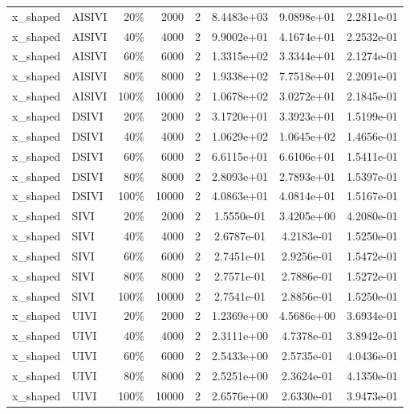 \begin{tabular}{llrrrccc}
x\_shaped & AISIVI & 20\% & 2000 & 2 & 8.4483e+03 & 9.0898e+01 & 2.2811e-01 \\
x\_shaped & AISIVI & 40\% & 4000 & 2 & 9.9002e+01 & 4.1674e+01 & 2.2532e-01 \\
x\_shaped & AISIVI & 60\% & 6000 & 2 & 1.3315e+02 & 3.3344e+01 & 2.1274e-01 \\
x\_shaped & AISIVI & 80\% & 8000 & 2 & 1.9338e+02 & 7.7518e+01 & 2.2091e-01 \\
x\_shaped & AISIVI & 100\% & 10000 & 2 & 1.0678e+02 & 3.0272e+01 & 2.1845e-01 \\
x\_shaped & DSIVI & 20\% & 2000 & 2 & 3.1720e+01 & 3.3923e+01 & 1.5199e-01 \\
x\_shaped & DSIVI & 40\% & 4000 & 2 & 1.0629e+02 & 1.0645e+02 & 1.4656e-01 \\
x\_shaped & DSIVI & 60\% & 6000 & 2 & 6.6115e+01 & 6.6106e+01 & 1.5411e-01 \\
x\_shaped & DSIVI & 80\% & 8000 & 2 & 2.8093e+01 & 2.7893e+01 & 1.5397e-01 \\
x\_shaped & DSIVI & 100\% & 10000 & 2 & 4.0863e+01 & 4.0814e+01 & 1.5167e-01 \\
x\_shaped & SIVI & 20\% & 2000 & 2 & 1.5550e-01 & 3.4205e+00 & 4.2080e-01 \\
x\_shaped & SIVI & 40\% & 4000 & 2 & 2.6787e-01 & 4.2183e-01 & 1.5250e-01 \\
x\_shaped & SIVI & 60\% & 6000 & 2 & 2.7451e-01 & 2.9256e-01 & 1.5472e-01 \\
x\_shaped & SIVI & 80\% & 8000 & 2 & 2.7571e-01 & 2.7886e-01 & 1.5272e-01 \\
x\_shaped & SIVI & 100\% & 10000 & 2 & 2.7541e-01 & 2.8856e-01 & 1.5250e-01 \\
x\_shaped & UIVI & 20\% & 2000 & 2 & 1.2369e+00 & 4.5686e+00 & 3.6934e-01 \\
x\_shaped & UIVI & 40\% & 4000 & 2 & 2.3111e+00 & 4.7378e-01 & 3.8942e-01 \\
x\_shaped & UIVI & 60\% & 6000 & 2 & 2.5433e+00 & 2.5735e-01 & 4.0436e-01 \\
x\_shaped & UIVI & 80\% & 8000 & 2 & 2.5251e+00 & 2.3624e-01 & 4.1350e-01 \\
x\_shaped & UIVI & 100\% & 10000 & 2 & 2.6576e+00 & 2.6330e-01 & 3.9473e-01 \\
\bottomrule
\end{tabular}
